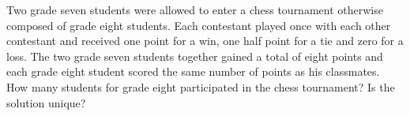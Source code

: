 Two grade seven students were allowed to enter a chess tournament otherwise composed of grade eight students. Each contestant played once with each other contestant and received one point for a win, one half point for a tie and zero for a loss. The two grade seven students together gained a total of eight points and each grade eight student scored the same number of points as his classmates. How many students for grade eight participated in the chess tournament? Is the solution unique?